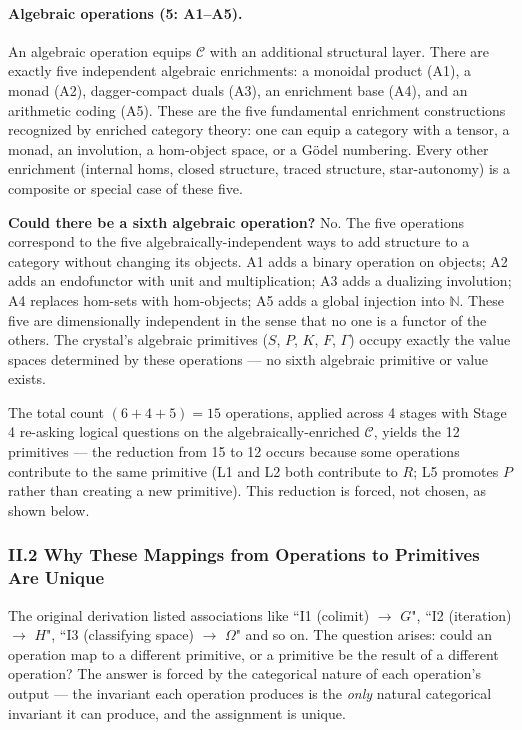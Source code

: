\documentclass[12pt,a4paper]{article}
\begin{document}
\paragraph{Algebraic operations (5: A1--A5).}
An algebraic operation equips $\mathcal{C}$ with an additional structural layer. There are exactly five independent algebraic enrichments: a monoidal product (A1), a monad (A2), dagger-compact duals (A3), an enrichment base (A4), and an arithmetic coding (A5). These are the five fundamental enrichment constructions recognized by enriched category theory: one can equip a category with a tensor, a monad, an involution, a hom-object space, or a G\"odel numbering. Every other enrichment (internal homs, closed structure, traced structure, star-autonomy) is a composite or special case of these five.

\textbf{Could there be a sixth algebraic operation?} No. The five operations correspond to the five algebraically-independent ways to add structure to a category without changing its objects. A1 adds a binary operation on objects; A2 adds an endofunctor with unit and multiplication; A3 adds a dualizing involution; A4 replaces hom-sets with hom-objects; A5 adds a global injection into $\mathbb{N}$. These five are dimensionally independent in the sense that no one is a functor of the others. The crystal's algebraic primitives ($S$, $P$, $K$, $F$, $\Gamma$) occupy exactly the value spaces determined by these operations --- no sixth algebraic primitive or value exists.

The total count $(6 + 4 + 5) = 15$ operations, applied across 4 stages with Stage 4 re-asking logical questions on the algebraically-enriched $\mathcal{C}$, yields the 12 primitives --- the reduction from 15 to 12 occurs because some operations contribute to the same primitive (L1 and L2 both contribute to $R$; L5 promotes $P$ rather than creating a new primitive). This reduction is forced, not chosen, as shown below.

\subsubsection{II.2 Why These Mappings from Operations to Primitives Are Unique}

The original derivation listed associations like ``I1 (colimit) $\to$ $G$", ``I2 (iteration) $\to$ $H$", ``I3 (classifying space) $\to$ $\Omega$" and so on. The question arises: could an operation map to a different primitive, or a primitive be the result of a different operation? The answer is forced by the categorical nature of each operation's output --- the invariant each operation produces is the \emph{only} natural categorical invariant it can produce, and the assignment is unique.
\end{document}
